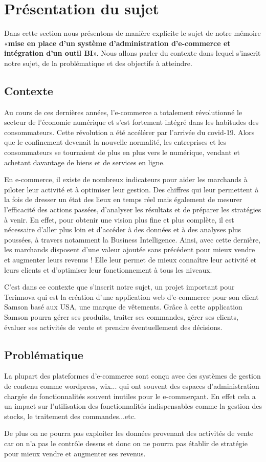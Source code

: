 \documentclass[a4paper, 12pt]{report}
\begin{document}
\section{Présentation du sujet}
{Dans cette section nous présentons de manière explicite le sujet de notre mémoire «\textbf{mise en place d’un système d’administration d’e-commerce et intégration d’un outil BI}». Nous allons parler du contexte dans lequel s’inscrit notre sujet, de la problématique et des objectifs à atteindre.}
\subsection{Contexte}
{Au cours de ces dernières années, l'e-commerce a totalement révolutionné le secteur de l’économie numérique et s’est fortement intégré dans les habitudes des consommateurs. Cette révolution a été accélérer par l’arrivée du covid-19. Alors que le confinement devenait la nouvelle normalité, les entreprises et les consommateurs se tournaient de plus en plus vers le numérique, vendant et achetant davantage de biens et de services en ligne. 

En e-commerce, il existe de nombreux indicateurs pour aider les marchands à piloter leur activité et à optimiser leur gestion. Des chiffres qui leur permettent à la fois de dresser un état des lieux en temps réel mais également de mesurer l’efficacité des actions passées, d’analyser les résultats et de préparer les stratégies à venir. En effet, pour obtenir une vision plus fine et plus complète, il est nécessaire d’aller plus loin et d’accéder à des données et à des analyses plus poussées, à travers notamment la Business Intelligence. Ainsi, avec cette dernière, les marchands disposent d’une valeur ajoutée sans précédent pour mieux vendre et augmenter leurs revenus ! Elle leur permet de mieux connaître leur activité et leurs clients et d’optimiser leur fonctionnement à tous les niveaux.

C’est dans ce contexte que s'inscrit notre sujet, un projet important pour Terinnova qui est la création d'une application web d’e-commerce pour son client Samson basé aux USA, une marque de vêtements. Grâce à cette application Samson pourra gérer ses produits, traiter ses commandes, gérer ses clients, évaluer ses activités de vente et prendre éventuellement des décisions.}
\subsection{Problématique}
{La plupart des plateformes d’e-commerce sont conçu avec des systèmes de gestion de contenu comme wordpress, wix... qui ont souvent des espaces d’administration chargée de fonctionnalités souvent inutiles pour le e-commerçant. En effet cela a un impact sur l’utilisation des fonctionnalités indispensables comme la gestion des stocks, le traitement des commandes...etc.

De plus on ne pourra pas exploiter les données provenant des activités de vente car on n'a pas le contrôle dessus et donc on ne pourra pas établir de stratégie pour mieux vendre et augmenter ses revenus.}
\end{document}
